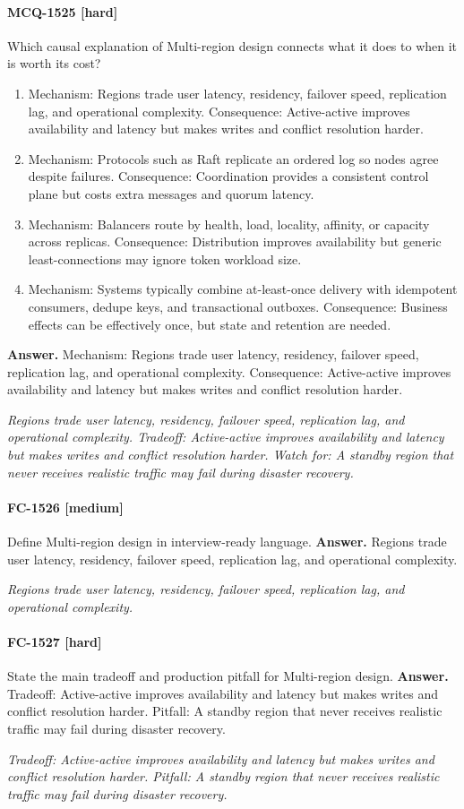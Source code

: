 \paragraph{MCQ-1525 [hard]} Which causal explanation of Multi-region design connects what it does to when it is worth its cost?
\begin{enumerate}[label=\Alph*.]
\item Mechanism: Regions trade user latency, residency, failover speed, replication lag, and operational complexity. Consequence: Active-active improves availability and latency but makes writes and conflict resolution harder.
\item Mechanism: Protocols such as Raft replicate an ordered log so nodes agree despite failures. Consequence: Coordination provides a consistent control plane but costs extra messages and quorum latency.
\item Mechanism: Balancers route by health, load, locality, affinity, or capacity across replicas. Consequence: Distribution improves availability but generic least-connections may ignore token workload size.
\item Mechanism: Systems typically combine at-least-once delivery with idempotent consumers, dedupe keys, and transactional outboxes. Consequence: Business effects can be effectively once, but state and retention are needed.
\end{enumerate}
\noindent\textbf{Answer.} Mechanism: Regions trade user latency, residency, failover speed, replication lag, and operational complexity. Consequence: Active-active improves availability and latency but makes writes and conflict resolution harder.
\par\textit{Regions trade user latency, residency, failover speed, replication lag, and operational complexity. Tradeoff: Active-active improves availability and latency but makes writes and conflict resolution harder. Watch for: A standby region that never receives realistic traffic may fail during disaster recovery.}
\paragraph{FC-1526 [medium]} Define Multi-region design in interview-ready language.
\noindent\textbf{Answer.} Regions trade user latency, residency, failover speed, replication lag, and operational complexity.
\par\textit{Regions trade user latency, residency, failover speed, replication lag, and operational complexity.}
\paragraph{FC-1527 [hard]} State the main tradeoff and production pitfall for Multi-region design.
\noindent\textbf{Answer.} Tradeoff: Active-active improves availability and latency but makes writes and conflict resolution harder. Pitfall: A standby region that never receives realistic traffic may fail during disaster recovery.
\par\textit{Tradeoff: Active-active improves availability and latency but makes writes and conflict resolution harder. Pitfall: A standby region that never receives realistic traffic may fail during disaster recovery.}
